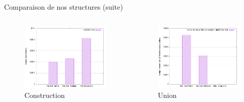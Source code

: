 \documentclass[11pt]{beamer}
\begin{document}
\begin{frame}{Comparaison de nos structures (suite)}

\begin{columns}[t]
  \begin{column}{5cm}
  
\begin{figure}[hbtp]
\centering
\includegraphics[width=5cm]{../Images/svg courbes pour rapport/temps_construction_shakespeare.png} 
\caption{Construction}
\label{fig1}
\end{figure}


  \end{column}
 
  \begin{column}{5cm}

\begin{figure}[hbtp]
\centering
\includegraphics[width=5cm]{../Images/svg courbes pour rapport/temps_union_shakespeare.png} 
\caption{Union}
\label{fig1}
\end{figure}

  \end{column}
 \end{columns}  


\end{frame}

\begin{frame}


\end{frame}
\end{document}
